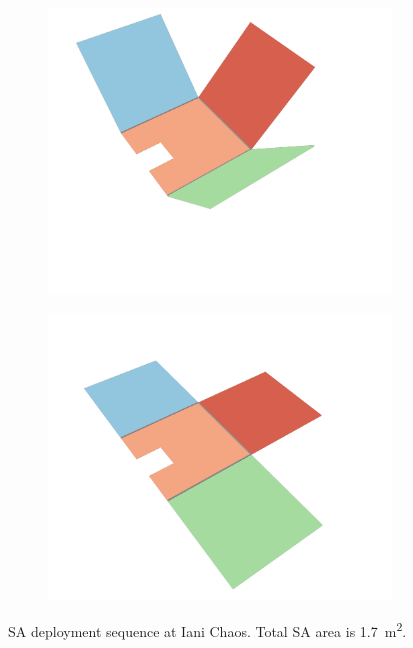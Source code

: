 \begin{figure}[h]
\begin{subfigure}[t]{\subfigureWidth}
		\includegraphics[height=\graphicsHeight]{sections/design/solar-array/images/deployment/iani-chaos/solar_array_deployment_iani_chaos_030.png}
		\label{fig:sub:deployment-sequence-iani-chaos-mid}
	\end{subfigure}\hfill
    \begin{subfigure}[t]{\subfigureWidth}
        \centering
		\includegraphics[height=\graphicsHeight]{sections/design/solar-array/images/deployment/iani-chaos/solar_array_deployment_iani_chaos_060.png}
		\label{fig:sub:deployment-sequence-iani-completed}
	\end{subfigure}
	\caption[Solar array deployment sequence at Iani Chaos]
    {\ac{SA} deployment sequence at Iani Chaos. Total \ac{SA} area is \SI{1.7}{\meter\squared}.}
	\label{fig:deployment-sequence-iani-chaos}
\vspace{-2ex}
\end{figure}

